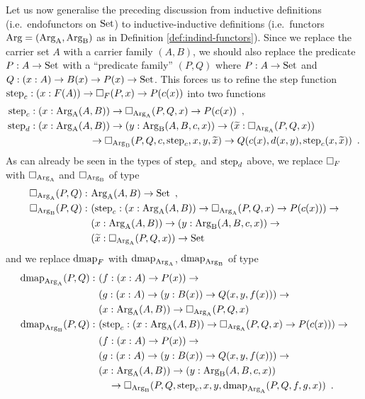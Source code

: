 \documentclass[orivec,envcountsame, ,envcountsect]{llncs}
\begin{document}
Let us now generalise the preceding discussion from inductive
definitions (i.e.\ endo\-functors on $\text{Set}$) to inductive-inductive
definitions (i.e.\ functors $\text{Arg} = (\text{Arg}_{\text{A}}, \text{Arg}_{\text{B}})$ as in Definition
\ref{def:indind-functors}). Since we replace the carrier set $A$ with
a carrier family $(A, B)$, we should also replace the predicate $P : A
\to \text{Set}$ with a ``predicate family'' $(P, Q)$ where $P : A \to \text{Set}$
and $Q : (x : A) \to B(x) \to P(x) \to \text{Set}$. This forces us to refine
the step function $\text{step}_{c} : (x : F(A)) \to \Box_F(P, x) \to P(c(x))$
into two functions
\begin{align*}
  \text{step}_{c} &: (x : \text{Arg}_{\text{A}}(A, B)) \to \Box_{\text{Arg}_{\text{A}}}(P, Q, x) \to P(c(x)) \enspace ,\\
  \text{step}_{d} &: (x : \text{Arg}_{\text{A}}(A, B)) \to (y : \text{Arg}_{\text{B}}(A, B, c, x)) \to
                   (\widetilde{x} : \Box_{\text{Arg}_{\text{A}}}(P, Q, x)) \\
              & \qquad\qquad\qquad \to \Box_{\text{Arg}_{\text{B}}}(P, Q, c, \text{step}_{c}, x, y, \widetilde{x}) \to Q(c(x), d(x, y), \text{step}_{c}(x, \widetilde{x})) \enspace .
\end{align*}
%
As can already be seen in the types of $\text{step}_{c}$ and $\text{step}_{d}$ above, we replace
$\Box_F$ with $\Box_{\text{Arg}_{\text{A}}}$ and $\Box_{\text{Arg}_{\text{B}}}$ of type
\begin{align*}
  \BOX_{\ArgA}(P, Q) :\ &\ArgA(A, B) \to \Set \enspace ,\\
%
  \BOX_{\ArgBpp}(P, Q) :\ %
                     &(\stepind{c} : (x : \ArgA(A, B)) \to \BOX_{\ArgA}(P, Q, x) \to P(c(x))) \to \\
                     &(x : \ArgA(A, B)) \to (y : \ArgBpp(A, B, c, x)) \to \\
                     & (\stepindarg{x} : \BOX_{\ArgA}(P, Q, x)) \to \Set
\end{align*} %
%
and we replace $\text{dmap}_F$ with $\text{dmap}_{\text{Arg}_{\text{A}}}$, $\text{dmap}_{\text{Arg}_{\text{B}}}$ of type
\begin{align*}
  \dmap_{\ArgA}(P, Q) :\ & (f : (x : A) \to P(x)) \to \\
                 & (g : (x : A) \to (y : B(x)) \to Q(x, y, f(x))) \to \\
                 & (x : \ArgA(A, B)) \to \BOX_{\ArgA}(P, Q, x) \\
%
  \dmap_{\ArgBpp}(P, Q) :\ &(\stepind{c} : (x : \ArgA(A, B)) \to \BOX_{\ArgA}(P, Q, x) \to P(c(x))) \to \\
                 & (f : (x : A) \to P(x)) \to \\
                 & (g : (x : A) \to (y : B(x)) \to Q(x, y, f(x))) \to \\
                 & (x : \ArgA(A, B)) \to (y : \ArgBpp(A, B, c, x)) \\ 
                 & \quad \to \BOX_{\ArgBpp}(P, Q, \stepind{c}, x, y, \dmap_{\ArgA}(P, Q, f, g, x)) \enspace .
\end{align*}
\end{document}
